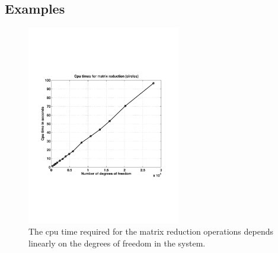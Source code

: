 \begin{versiona}
\section{Examples}

\begin{figure}[tbhp]
  \vspace{-25mm}
  \centerline{\includegraphics[width=0.6\textwidth]{reduction_cpu.pdf}}
  \vspace{-25mm}
  \caption{The cpu time required for the matrix reduction operations
  depends linearly on the degrees of freedom in the system.}
\end{figure}


\end{versiona}
